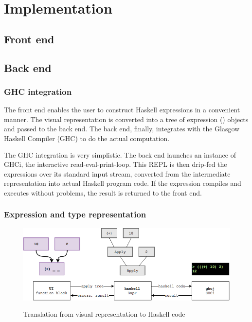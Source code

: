 \chapter{Implementation}
\label{chap:implementation}

\section{Front end}

\section{Back end}

\subsection{GHC integration}

The front end enables the user to construct Haskell expressions in a convenient manner.
The visual representation is converted into a tree of expression () objects and passed to the back end. 
The back end, finally, integrates with the Glasgow Haskell Compiler (\gls{GHC}) to do the actual computation.

The GHC integration is very simplistic.
The back end launches an instance of GHCi, the interactive read-eval-print-loop. 
This \gls{REPL} is then drip-fed the expressions over its standard input stream, converted from the intermediate representation into actual Haskell program code.
If the expression compiles and executes without problems, the result is returned to the front end.

\subsection{Expression and type representation}

\begin{figure}[h]
	\centering
	\includegraphics[scale=0.5]{Images/exprtohaskell}
	\label{fig:classdiagram-expr}
	\caption{Translation from visual representation to Haskell code}
\end{figure}

